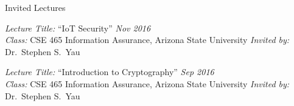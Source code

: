 
\begin{rBulletSubsection}{Invited Lectures}

  \item \emph{Lecture Title:} ``IoT Security'' \hfill \emph{Nov 2016} \\
    \emph{Class:} CSE 465 Information Assurance, Arizona State University \hfill \emph{Invited by:} Dr.\ Stephen S.\ Yau

  \item \emph{Lecture Title:} ``Introduction to Cryptography'' \hfill \emph{Sep 2016} \\
    \emph{Class:} CSE 465 Information Assurance, Arizona State University \hfill \emph{Invited by:} Dr.\ Stephen S.\ Yau




\end{rBulletSubsection}
